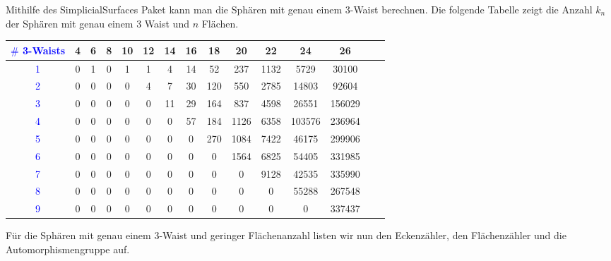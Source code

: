\documentclass[12pt,titlepage,twoside,cleardoublepage]{article}
\theoremstyle{nummermitklammern}
\numberwithin{equation}{section}
\begin{document}
Mithilfe des SimplicialSurfaces Paket kann man die Sphären mit genau einem 3-Waist berechnen. Die folgende Tabelle zeigt die Anzahl $k_n$ der Sphären mit genau einem 3 Waist und $n$ Flächen. 
\begin{center}
\begin{tabular}{|c|c|c|c|c|c|c|c|c|c|c|c|c|c|c|}
\hline
\textcolor{blue}{$\#$ 3-Waists }&\textbf{4}& \textbf{6}& \textbf{8}& \textbf{10}& \textbf{12}& \textbf{14}& \textbf{16}& \textbf{18}& \textbf{20}& \textbf{22}& \textbf{24}& \textbf{26}\\
\hline
\textcolor{blue}{1} &0& 1& 0& 1& 1& 4& 14& 52& 237& 1132& 5729& 30100\\
\hline
\textcolor{blue}{2} &0& 0& 0 &0& 4& 7& 30& 120& 550& 2785& 14803& 92604\\
\hline
\textcolor{blue}{3}& 0& 0& 0& 0& 0& 11& 29& 164& 837& 4598& 26551& 156029\\
\hline
\textcolor{blue}{4}& 0& 0& 0& 0& 0& 0& 57& 184& 1126& 6358& 103576& 236964\\
\hline
\textcolor{blue}{5}& 0& 0& 0& 0& 0& 0& 0& 270& 1084& 7422& 46175& 299906\\
\hline
\textcolor{blue}{6} &0& 0& 0& 0& 0& 0& 0& 0 &1564& 6825& 54405& 331985\\
\hline
\textcolor{blue}{7}& 0& 0& 0& 0& 0& 0& 0& 0& 0& 9128& 42535& 335990\\
\hline
\textcolor{blue}{8}& 0& 0& 0& 0& 0& 0& 0& 0& 0& 0& 55288& 267548\\
\hline
\textcolor{blue}{9} &0& 0& 0& 0& 0& 0& 0& 0& 0& 0& 0& 337437\\
\hline
\end{tabular}
\end{center}
\begin{comment}
\begin{center}
\begin{tabular}[h]{|c|c|c|c|c|c|c|c|c|c|c|c|c|c|}
\hline
\textbf{$\vert X_2\vert$}& \textbf{4} &  \textbf{6}& \textbf{8} & \textbf{10} & \textbf{12} & \textbf{14}&\textbf{16}&\textbf{18}&\textbf{20}&\textbf{22}&\textbf{24}&\textbf{26}&\textbf{28}\\
\hline
 \textbf{$k_n$}  &0& 1& 0& 1 &1& 4& 14& 52 &237& 1132& 5729& 30100& 162410\\
 \hline
\end{tabular}
\end{center}
\end{comment}
Für die Sphären mit genau einem 3-Waist und geringer Flächenanzahl listen wir nun den Eckenzähler, den Flächenzähler und die Automorphismengruppe auf.
\end{document}
